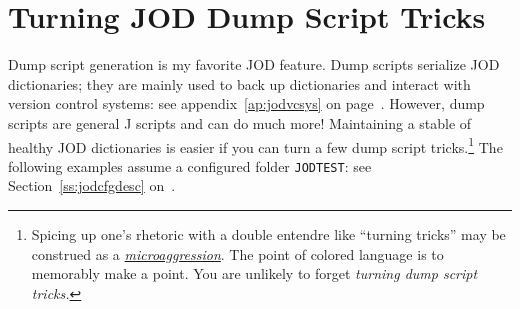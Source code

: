 \section{Turning JOD Dump Script Tricks}\label{ap:joddumptricks}

Dump script generation is my favorite JOD feature. Dump scripts serialize 
JOD dictionaries; they are mainly used to back up dictionaries and interact with 
version control systems: see appendix~\ref{ap:jodvcsys} on page~\pageref{ap:jodvcsys}.
However, dump scripts are general J scripts and can do much more!  
Maintaining a stable of healthy JOD dictionaries is easier 
if you can turn a few dump script tricks.\footnote{Spicing up one's rhetoric with a double entendre 
like ``turning tricks'' may be construed as a 
\href{http://thefederalist.com/2015/03/24/microaggressions-and-trigger-warnings-meet-real-trauma/}{\emph{microaggression}}. 
The point of colored language is to memorably make a point. 
You are unlikely to forget \emph{turning dump script tricks.} 
} The following examples assume a configured folder \verb|JODTEST|: see Section~\ref{ss:jodcfgdesc} on~\pageref{ss:jodcfgdesc}.

